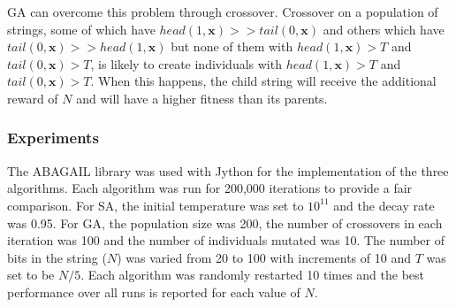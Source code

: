 \documentclass[letterpaper]{article}
\begin{document}
	GA can overcome this problem through crossover. Crossover on a population of strings, some of which have $head(1, \mathbf{x}) >> tail(0, \mathbf{x})$ and others which have $tail(0, \mathbf{x}) >> head(1, \mathbf{x})$ but none of them with $head(1, \mathbf{x}) > T$ and $tail(0, \mathbf{x}) > T$, is likely to create individuals with $head(1, \mathbf{x}) > T$ and $tail(0, \mathbf{x}) > T$. When this happens, the child string will receive the additional reward of $N$ and will have a higher fitness than its parents.
	
	\subsubsection{Experiments}
	\label{sec:fourpeaks_exp}
	The ABAGAIL library was used with Jython for the implementation of the three algorithms. Each algorithm was run for 200,000 iterations to provide a fair comparison. For SA, the initial temperature was set to $10^{11}$ and the decay rate was 0.95. For GA, the population size was 200, the number of crossovers in each iteration was 100 and the number of individuals mutated was 10. The number of bits in the string ($N$) was varied from 20 to 100 with increments of 10 and $T$ was set to be $N/5$. Each algorithm was randomly restarted 10 times and the best performance over all runs is reported for each value of $N$.
	
\end{document}
